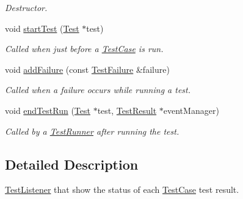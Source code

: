 \begin{DoxyCompactItemize}
\begin{DoxyCompactList}\small\item\em Destructor. \end{DoxyCompactList}\item 
\hypertarget{class_text_test_progress_listener_ae5089aa6b0bcae0128604691f23ed224}{void \hyperlink{class_text_test_progress_listener_ae5089aa6b0bcae0128604691f23ed224}{start\+Test} (\hyperlink{class_test}{Test} $\ast$test)}\label{class_text_test_progress_listener_ae5089aa6b0bcae0128604691f23ed224}

\begin{DoxyCompactList}\small\item\em Called when just before a \hyperlink{class_test_case}{Test\+Case} is run. \end{DoxyCompactList}\item 
void \hyperlink{class_text_test_progress_listener_a66f5a921e6e3ceecc8a286df7b60abcf}{add\+Failure} (const \hyperlink{class_test_failure}{Test\+Failure} \&failure)
\begin{DoxyCompactList}\small\item\em Called when a failure occurs while running a test. \end{DoxyCompactList}\item 
void \hyperlink{class_text_test_progress_listener_a12df92f16f1e2b9d571fd064fb7f30bd}{end\+Test\+Run} (\hyperlink{class_test}{Test} $\ast$test, \hyperlink{class_test_result}{Test\+Result} $\ast$event\+Manager)
\begin{DoxyCompactList}\small\item\em Called by a \hyperlink{class_test_runner}{Test\+Runner} after running the test. \end{DoxyCompactList}\end{DoxyCompactItemize}


\subsection{Detailed Description}
\hyperlink{class_test_listener}{Test\+Listener} that show the status of each \hyperlink{class_test_case}{Test\+Case} test result. 

